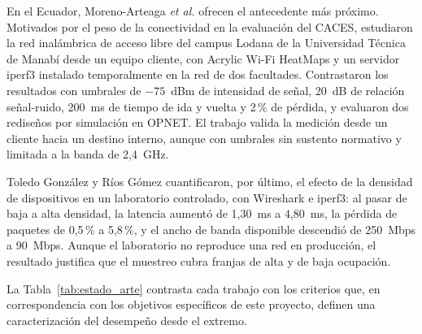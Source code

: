 En el Ecuador, Moreno-Arteaga \textit{et al.} \cite{moreno2023sitesurvey} ofrecen el antecedente más próximo. Motivados por el peso de la conectividad en la evaluación del CACES, estudiaron la red inalámbrica de acceso libre del campus Lodana de la Universidad Técnica de Manabí desde un equipo cliente, con Acrylic Wi-Fi HeatMaps y un servidor iperf3 instalado temporalmente en la red de dos facultades. Contrastaron los resultados con umbrales de $-75$~dBm de intensidad de señal, 20~dB de relación señal-ruido, 200~ms de tiempo de ida y vuelta y 2\,\% de pérdida, y evaluaron dos rediseños por simulación en OPNET. El trabajo valida la medición desde un cliente hacia un destino interno, aunque con umbrales sin sustento normativo y limitada a la banda de 2,4~GHz.

Toledo González y Ríos Gómez \cite{toledo2026densidad} cuantificaron, por último, el efecto de la densidad de dispositivos en un laboratorio controlado, con Wireshark e iperf3: al pasar de baja a alta densidad, la latencia aumentó de 1,30~ms a 4,80~ms, la pérdida de paquetes de 0,5\,\% a 5,8\,\%, y el ancho de banda disponible descendió de 250~Mbps a 90~Mbps. Aunque el laboratorio no reproduce una red en producción, el resultado justifica que el muestreo cubra franjas de alta y de baja ocupación.

La Tabla~\ref{tab:estado_arte} contrasta cada trabajo con los criterios que, en correspondencia con los objetivos específicos de este proyecto, definen una caracterización del desempeño desde el extremo.

